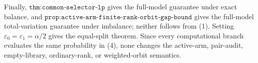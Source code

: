 Finally, \(\texttt{thm:common-selector-lp}\) gives the full-model guarantee under exact balance, and \(\texttt{prop:active-arm-finite-rank-orbit-gap-bound}\) gives the full-model total-variation guarantee under imbalance; neither follows from (1). Setting \(\varepsilon_0=\varepsilon_1=\alpha/2\) gives the equal-split theorem. Since every computational branch evaluates the same probability in (4), none changes the active-arm, pair-audit, empty-library, ordinary-rank, or weighted-orbit semantics.